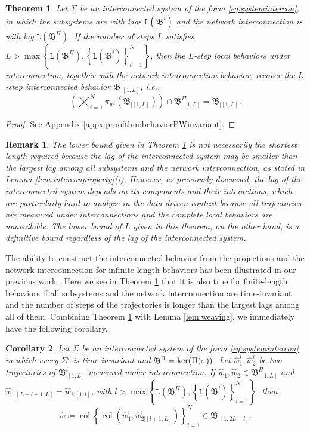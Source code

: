 \documentclass[11pt,print,draftcls,onecolumn,romanappendices]{ieeecolor}
\newtheorem{thm}{Theorem}
\newtheorem{cor}[thm]{Corollary}
\newtheorem{rem}{Remark}
\DeclareMathOperator{\col}{col}
\newcommand{\lag}[1]{\mathtt{L}\left(#1\right)}
\newcommand{\proj}[2]{\pi_{#1}\left(#2\right)}
\newcommand{\revise}[1]{{\color{black} #1}}
\newcommand{\B}{\mathfrak{B}}
\newcommand{\bint}[1]{{|[#1]}}
\begin{document}
\begin{thm}\label{thm:behaviorPWinvariant}
	Let $\Sigma$ be an interconnected system of the form \eqref{eq:systemintercon}, in which the subsystems are with lags $\lag{\B^i}$ and the network interconnection is with lag $\lag{\B^\Pi}$. If the number of steps $L$ satisfies $L>\max\left\{\lag{\B^\Pi},\left\{\lag{\B^i}\right\}_{i=1}^N\right\}$, then the $L$-step local behaviors \emph{under interconnection}, together with the network interconnection behavior, recover the $L$-step interconnected behavior $\B_\bint{1,L}$, i.e.,
	\begin{equation}\label{eq:interconinvariant}
		\left(\bigtimes_{i=1}^N\proj{w^i}{\B_\bint{1,L}}\right)\cap\B^\Pi_\bint{1,L}=\B_\bint{1,L}.
	\end{equation}
\end{thm}
\begin{proof}
	See Appendix \ref{appx:proofthm:behaviorPWinvariant}.
\end{proof}
\begin{rem}\label{rem:lagofintercon}
	The lower bound given in Theorem \ref{thm:behaviorPWinvariant} is not necessarily the shortest length required because the lag of the interconnected system may be smaller than the largest lag among all subsystems and the network interconnection, as stated in Lemma \ref{lem:interconproperty}(i). However, as previously discussed, the lag of the interconnected system depends on its components and their interactions, which are particularly hard to analyze in the data-driven context because all trajectories are measured under interconnections and the complete local behaviors are unavailable. The lower bound of $L$ given in this theorem, on the other hand, is a definitive bound regardless of the lag of the interconnected system.
\end{rem}

The ability to construct the interconnected behavior from the projections and the network interconnection for infinite-length behaviors has been illustrated in our previous work \cite{Yan:2021}. Here we see in Theorem \ref{thm:behaviorPWinvariant} that it is also true for finite-length behaviors if all subsystems and the network interconnection are time-invariant and the number of steps of the trajectories is longer than the largest lags among all of them. Combining Theorem \ref{thm:behaviorPWinvariant} with Lemma \ref{lem:weaving}, we immediately have the following corollary.
\begin{cor}
	Let $\Sigma$ be an interconnected system of the form \eqref{eq:systemintercon}, in which every $\Sigma^i$ is time-invariant and $\B^\Pi=\revise{\ker(\Pi(\sigma))}$. Let $\hat{w}_1^i,\hat{w}_2^i$ be two trajectories of $\B^i_\bint{1,L}$ measured under interconnection. If $\hat{w}_1,\hat{w}_2\in\B^\Pi_\bint{1,L}$ and $\hat{w}_{1\bint{L-l+1,L}}=\hat{w}_{2\bint{1,l}}$, with $l>\max\left\{\lag{\B^\Pi},\left\{\lag{\B^i}\right\}_{i=1}^N\right\}$, then
	\begin{equation}
		\hat{w}\coloneqq\col\left\{\col\left(\hat{w}_1^i,\hat{w}^i_{2\bint{l+1,L}}\right)\right\}_{i=1}^N\in\B_\bint{1,2L-l}.
	\end{equation}
\end{cor}
\end{document}
